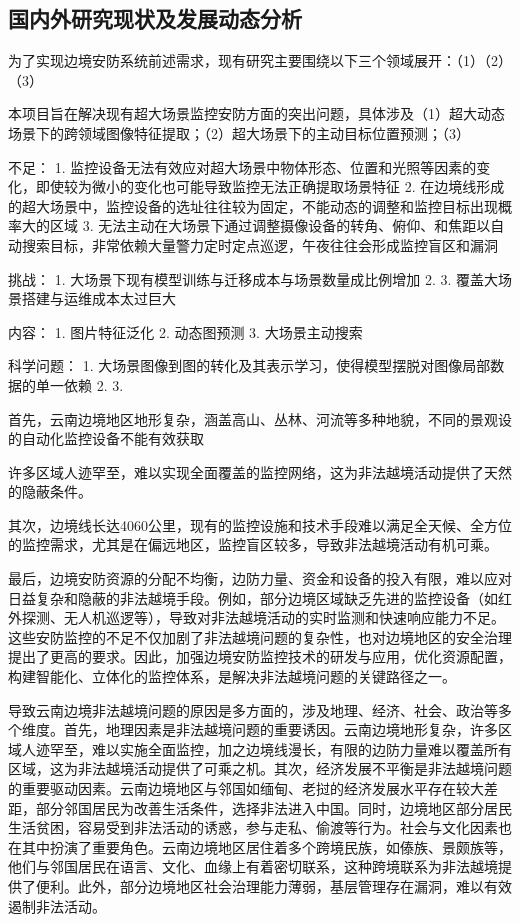 \subsection{国内外研究现状及发展动态分析}

为了实现边境安防系统前述需求，现有研究主要围绕以下三个领域展开：（1）（2）（3）

本项目旨在解决现有超大场景监控安防方面的突出问题，具体涉及（1）超大动态场景下的跨领域图像特征提取；（2）超大场景下的主动目标位置预测；（3）


不足：
1. 监控设备无法有效应对超大场景中物体形态、位置和光照等因素的变化，即使较为微小的变化也可能导致监控无法正确提取场景特征
2. 在边境线形成的超大场景中，监控设备的选址往往较为固定，不能动态的调整和监控目标出现概率大的区域
3. 无法主动在大场景下通过调整摄像设备的转角、俯仰、和焦距以自动搜索目标，非常依赖大量警力定时定点巡逻，午夜往往会形成监控盲区和漏洞

挑战：
1. 大场景下现有模型训练与迁移成本与场景数量成比例增加
2. 
3. 覆盖大场景搭建与运维成本太过巨大

内容：
1. 图片特征泛化
2. 动态图预测
3. 大场景主动搜索

科学问题：
1. 大场景图像到图的转化及其表示学习，使得模型摆脱对图像局部数据的单一依赖
2. 
3.

首先，云南边境地区地形复杂，涵盖高山、丛林、河流等多种地貌，不同的景观设的自动化监控设备不能有效获取

许多区域人迹罕至，难以实现全面覆盖的监控网络，这为非法越境活动提供了天然的隐蔽条件。

其次，边境线长达4060公里，现有的监控设施和技术手段难以满足全天候、全方位的监控需求，尤其是在偏远地区，监控盲区较多，导致非法越境活动有机可乘。

最后，边境安防资源的分配不均衡，边防力量、资金和设备的投入有限，难以应对日益复杂和隐蔽的非法越境手段。例如，部分边境区域缺乏先进的监控设备（如红外探测、无人机巡逻等），导致对非法越境活动的实时监测和快速响应能力不足。这些安防监控的不足不仅加剧了非法越境问题的复杂性，也对边境地区的安全治理提出了更高的要求。因此，加强边境安防监控技术的研发与应用，优化资源配置，构建智能化、立体化的监控体系，是解决非法越境问题的关键路径之一。
















导致云南边境非法越境问题的原因是多方面的，涉及地理、经济、社会、政治等多个维度。首先，地理因素是非法越境问题的重要诱因。云南边境地形复杂，许多区域人迹罕至，难以实施全面监控，加之边境线漫长，有限的边防力量难以覆盖所有区域，这为非法越境活动提供了可乘之机。其次，经济发展不平衡是非法越境问题的重要驱动因素。云南边境地区与邻国如缅甸、老挝的经济发展水平存在较大差距，部分邻国居民为改善生活条件，选择非法进入中国。同时，边境地区部分居民生活贫困，容易受到非法活动的诱惑，参与走私、偷渡等行为。社会与文化因素也在其中扮演了重要角色。云南边境地区居住着多个跨境民族，如傣族、景颇族等，他们与邻国居民在语言、文化、血缘上有着密切联系，这种跨境联系为非法越境提供了便利。此外，部分边境地区社会治理能力薄弱，基层管理存在漏洞，难以有效遏制非法活动。

